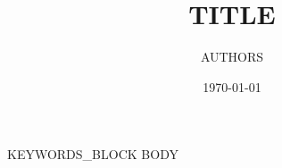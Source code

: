 \documentclass[11pt]{ctexart}
\title{{{TITLE}}}
\author{{{AUTHORS}}}
\date{\today}
\begin{document}
\maketitle

{{KEYWORDS_BLOCK}}
{{BODY}}



\end{document}
